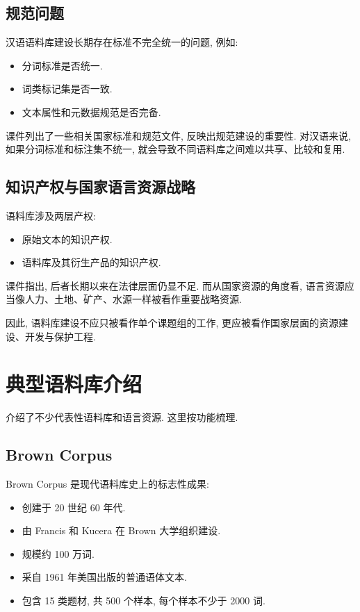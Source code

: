 \subsection{规范问题}


汉语语料库建设长期存在标准不完全统一的问题, 例如:

\begin{itemize}
\item 分词标准是否统一.
\item 词类标记集是否一致.
\item 文本属性和元数据规范是否完备.
\end{itemize}

课件列出了一些相关国家标准和规范文件, 反映出规范建设的重要性.
对汉语来说, 如果分词标准和标注集不统一, 就会导致不同语料库之间难以共享、比较和复用.

\subsection{知识产权与国家语言资源战略}


语料库涉及两层产权:

\begin{itemize}
\item 原始文本的知识产权.
\item 语料库及其衍生产品的知识产权.
\end{itemize}

课件指出, 后者长期以来在法律层面仍显不足.
而从国家资源的角度看, 语言资源应当像人力、土地、矿产、水源一样被看作重要战略资源.

因此, 语料库建设不应只被看作单个课题组的工作, 更应被看作国家层面的资源建设、开发与保护工程.

\section{典型语料库介绍}


介绍了不少代表性语料库和语言资源. 这里按功能梳理.

\subsection{Brown Corpus}


Brown Corpus 是现代语料库史上的标志性成果:

\begin{itemize}
\item 创建于 20 世纪 60 年代.
\item 由 Francis 和 Kucera 在 Brown 大学组织建设.
\item 规模约 100 万词.
\item 采自 1961 年美国出版的普通语体文本.
\item 包含 15 类题材, 共 500 个样本, 每个样本不少于 2000 词.
\end{itemize}

